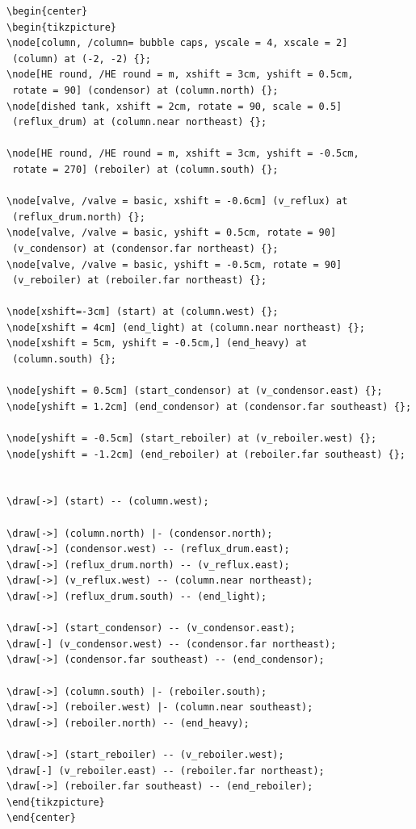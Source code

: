 \begin{lstlisting}[language={[LaTeX]TeX}]
\begin{center}
\begin{tikzpicture}
\node[column, /column= bubble caps, yscale = 4, xscale = 2] 
 (column) at (-2, -2) {};
\node[HE round, /HE round = m, xshift = 3cm, yshift = 0.5cm, 
 rotate = 90] (condensor) at (column.north) {};
\node[dished tank, xshift = 2cm, rotate = 90, scale = 0.5] 
 (reflux_drum) at (column.near northeast) {};

\node[HE round, /HE round = m, xshift = 3cm, yshift = -0.5cm, 
 rotate = 270] (reboiler) at (column.south) {};

\node[valve, /valve = basic, xshift = -0.6cm] (v_reflux) at 
 (reflux_drum.north) {};
\node[valve, /valve = basic, yshift = 0.5cm, rotate = 90] 
 (v_condensor) at (condensor.far northeast) {};
\node[valve, /valve = basic, yshift = -0.5cm, rotate = 90] 
 (v_reboiler) at (reboiler.far northeast) {};

\node[xshift=-3cm] (start) at (column.west) {};
\node[xshift = 4cm] (end_light) at (column.near northeast) {};
\node[xshift = 5cm, yshift = -0.5cm,] (end_heavy) at 
 (column.south) {};

\node[yshift = 0.5cm] (start_condensor) at (v_condensor.east) {};
\node[yshift = 1.2cm] (end_condensor) at (condensor.far southeast) {};

\node[yshift = -0.5cm] (start_reboiler) at (v_reboiler.west) {};
\node[yshift = -1.2cm] (end_reboiler) at (reboiler.far southeast) {};


\draw[->] (start) -- (column.west);

\draw[->] (column.north) |- (condensor.north);
\draw[->] (condensor.west) -- (reflux_drum.east);
\draw[->] (reflux_drum.north) -- (v_reflux.east);
\draw[->] (v_reflux.west) -- (column.near northeast);
\draw[->] (reflux_drum.south) -- (end_light);

\draw[->] (start_condensor) -- (v_condensor.east);
\draw[-] (v_condensor.west) -- (condensor.far northeast);
\draw[->] (condensor.far southeast) -- (end_condensor);

\draw[->] (column.south) |- (reboiler.south);
\draw[->] (reboiler.west) |- (column.near southeast);
\draw[->] (reboiler.north) -- (end_heavy);

\draw[->] (start_reboiler) -- (v_reboiler.west);
\draw[-] (v_reboiler.east) -- (reboiler.far northeast);
\draw[->] (reboiler.far southeast) -- (end_reboiler);
\end{tikzpicture}
\end{center}
\end{lstlisting}